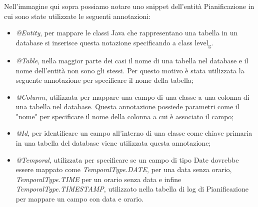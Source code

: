 \noindent Nell'immagine qui sopra possiamo notare uno snippet dell'entità Pianificazione in cui sono state utilizzate le seguenti annotazioni:
\begin{itemize}
\item \textit{@Entity}, per mappare le classi Java che rappresentano una tabella in un database si inserisce questa notazione specificando a class level\textsubscript{g}.
\item \textit{@Table}, nella maggior parte dei casi il nome di una tabella nel database e il nome dell'entità non sono gli stessi. Per questo motivo è stata utilizzata la seguente annotazione per specificare il nome della tabella;
\item \textit{@Column}, utilizzata per mappare una campo di una classe a una colonna di una tabella nel database. Questa annotazione possiede parametri come il "nome" per specificare il nome della colonna a cui è associato il campo;
\item \textit{@Id}, per identificare un campo all'interno di una classe come chiave primaria in una tabella del database viene utilizzata questa annotazione;
\item \textit{@Temporal}, utilizzata per specificare se un campo di tipo Date dovrebbe essere mappato come \textit{TemporalType.DATE}, per una data senza orario, \textit{TemporalType.TIME} per un orario senza data e infine \textit{TemporalType.TIMESTAMP}, utilizzato nella tabella di log di Pianificazione per mappare un campo con data e orario.
\end{itemize}

